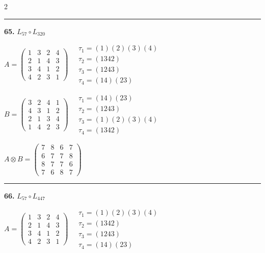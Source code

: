 \begin{multicols}{2}
\vspace{0.3em}
\hrule
\vspace{0.3em}

\noindent\textbf{65.} $L_{57} \circ L_{320}$

$A = \begin{pmatrix} 1 & 3 & 2 & 4 \\ 2 & 1 & 4 & 3 \\ 3 & 4 & 1 & 2 \\ 4 & 2 & 3 & 1 \end{pmatrix} \quad \begin{matrix} \tau_{1}=(1)(2)(3)(4) \\ \tau_{2}=(1 3 4 2) \\ \tau_{3}=(1 2 4 3) \\ \tau_{4}=(1 4)(2 3) \end{matrix}$

$B = \begin{pmatrix} 3 & 2 & 4 & 1 \\ 4 & 3 & 1 & 2 \\ 2 & 1 & 3 & 4 \\ 1 & 4 & 2 & 3 \end{pmatrix} \quad \begin{matrix} \tau_{1}=(1 4)(2 3) \\ \tau_{2}=(1 2 4 3) \\ \tau_{3}=(1)(2)(3)(4) \\ \tau_{4}=(1 3 4 2) \end{matrix}$

$A \otimes B = \begin{pmatrix} 7 & 8 & 6 & 7 \\ 6 & 7 & 7 & 8 \\ 8 & 7 & 7 & 6 \\ 7 & 6 & 8 & 7 \end{pmatrix}$

\vspace{0.3em}
\hrule
\vspace{0.3em}

\noindent\textbf{66.} $L_{57} \circ L_{447}$

$A = \begin{pmatrix} 1 & 3 & 2 & 4 \\ 2 & 1 & 4 & 3 \\ 3 & 4 & 1 & 2 \\ 4 & 2 & 3 & 1 \end{pmatrix} \quad \begin{matrix} \tau_{1}=(1)(2)(3)(4) \\ \tau_{2}=(1 3 4 2) \\ \tau_{3}=(1 2 4 3) \\ \tau_{4}=(1 4)(2 3) \end{matrix}$


\end{multicols}
